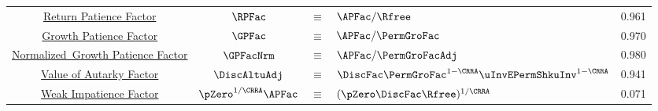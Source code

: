 \begin{table}
{\begin{tabular}{|c|ccl|c|}
\href{https://\owner.github.io/BufferStockTheory\#RPFacDefn}{Return Patience Factor}                      & $\RPFac$ & $\equiv$ & $\APFac/\Rfree $     & 0.961 \\
\href{https://\owner.github.io/BufferStockTheory\#GPFacRawDefn}{\phantom{Normalized~}Growth Patience Factor}    & $\GPFac$ & $\equiv$ & $\APFac/\PermGroFac $      & 0.970 \\
\href{https://\owner.github.io/BufferStockTheory\#GPFacRawDefn}{Normalized~Growth Patience Factor}                      & $\GPFacNrm$ & $\equiv$ & $ \APFac/\PermGroFacAdj$& 0.980 \\
\href{https://\owner.github.io/BufferStockTheory\#VAFDefn}{Value of Autarky Factor}         & $\DiscAltuAdj $ & $\equiv$ & $ \DiscFac \PermGroFac^{1-\CRRA}\uInvEPermShkuInv^{1-\CRRA}$       & 0.941 \\
\href{https://\owner.github.io/BufferStockTheory\#WRICCond}{Weak Impatience Factor}         & $\pZero^{1/\CRRA} \APFac $ & $\equiv$ & $ (\pZero \DiscFac \Rfree)^{1/\CRRA}$       & 0.071 \\ \hline
\end{tabular}
} %
\settowidth\TableWidth{\usebox{\Calibration}}

\newlength{\CalibrationShrunk}
\newsavebox{\CalibrationShrunkBox}

\savebox{\CalibrationShrunkBox}{
  \settowidth{\CalibrationShrunk}{\usebox{\Calibration}}
  \resizebox{0.9\textwidth}{!}{\begin{minipage}{\CalibrationShrunk}
      \usebox{\Calibration}
    \end{minipage}}
}

\usebox{\CalibrationShrunkBox}

\end{table}
